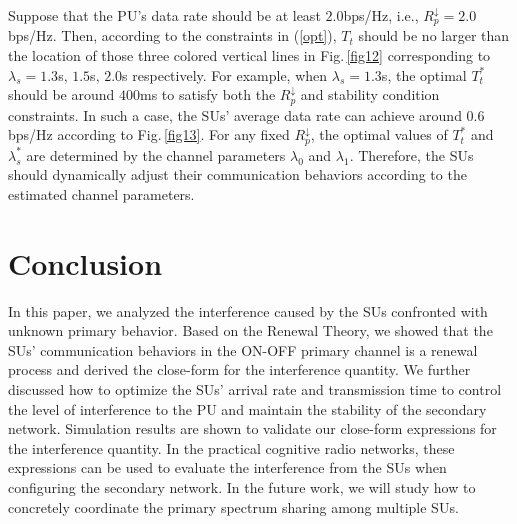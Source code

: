 \documentclass[11pt,draftcls]{IEEEtran}{\onecolumn}
\begin{document}
Suppose that the PU's data rate should be at least $2.0$bps/Hz,
i.e., $R_{p}^{\downarrow}=2.0$bps/Hz. Then, according to the
constraints in (\ref{opt}), $T_t$ should be no larger than the
location of those three colored vertical lines in Fig.\,\ref{fig12}
corresponding to $\lambda_s=1.3$s, $1.5$s, $2.0$s respectively. For
example, when $\lambda_s=1.3$s, the optimal $T_t^\ast$ should be
around $400$ms to satisfy both the $R_{p}^{\downarrow}$ and
stability condition constraints. In such a case, the SUs' average
data rate can achieve around $0.6$bps/Hz according to
Fig.\,\ref{fig13}. For any fixed $R_{p}^{\downarrow}$, the optimal
values of $T_t^\ast$ and $\lambda_s^\ast$ are determined by the
channel parameters $\lambda_0$ and $\lambda_1$. Therefore, the SUs
should dynamically adjust their communication behaviors according to
the estimated channel parameters.















\section{Conclusion}\label{conclusion}
In this paper, we analyzed the interference caused by the SUs
confronted with unknown primary behavior. Based on the Renewal
Theory, we showed that the SUs' communication behaviors in the
ON-OFF primary channel is a renewal process and derived the
close-form for the interference quantity. We further discussed how
to optimize the SUs' arrival rate and transmission time to control
the level of interference to the PU and maintain the stability of
the secondary network. Simulation results are shown to validate our
close-form expressions for the interference quantity. In the
practical cognitive radio networks, these expressions can be used to
evaluate the interference from the SUs when configuring the
secondary network. In the future work, we will study how to
concretely coordinate the primary spectrum sharing among multiple
SUs.













\ifCLASSOPTIONcaptionsoff
  \newpage
\fi
\end{document}
